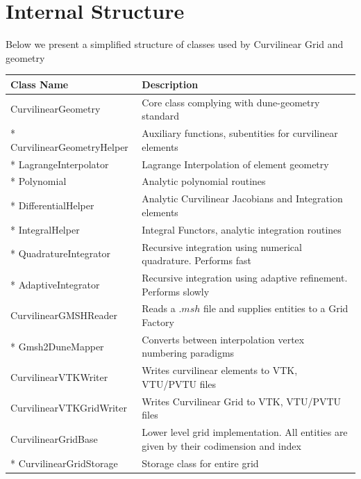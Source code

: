 \section{Internal Structure}
\label{section-outline-internalstructure}

Below we present a simplified structure of classes used by Curvilinear Grid and geometry \\

\noindent
\begin{tabularx}{\textwidth}{ l | X }
\hline
   Class Name & Description \\ \hline
   CurvilinearGeometry                & Core class complying with dune-geometry standard \\ \hline
   * CurvilinearGeometryHelper        & Auxiliary functions, subentities for curvilinear elements \\ \hline
   * LagrangeInterpolator             & Lagrange Interpolation of element geometry \\ \hline
   * Polynomial                       & Analytic polynomial routines \\ \hline
   * DifferentialHelper               & Analytic Curvilinear Jacobians and Integration elements \\ \hline
   * IntegralHelper                   & Integral Functors, analytic integration routines  \\ \hline
   * QuadratureIntegrator             & Recursive integration using numerical quadrature. Performs fast \\ \hline
   * AdaptiveIntegrator               & Recursive integration using adaptive refinement. Performs slowly \\ \hline
  CurvilinearGMSHReader               & Reads a $.msh$ file and supplies entities to a Grid Factory \\ \hline
  * Gmsh2DuneMapper                   & Converts between interpolation vertex numbering paradigms \\ \hline
  CurvilinearVTKWriter                & Writes curvilinear elements to VTK, VTU/PVTU files \\ \hline
  CurvilinearVTKGridWriter            & Writes Curvilinear Grid to VTK, VTU/PVTU files \\ \hline
  CurvilinearGridBase                 & Lower level grid implementation. All entities are given by their codimension and index \\ \hline
  * CurvilinearGridStorage            & Storage class for entire grid \\ \hline

\end{tabularx}
